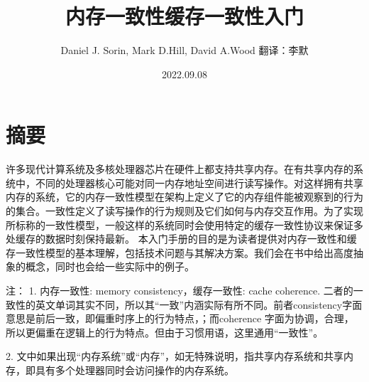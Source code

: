 \documentclass[UTF-8]{ctexbook}
\begin{document}
\title{内存一致性缓存一致性入门}
\author{Daniel J. Sorin, Mark D.Hill, David A.Wood 翻译：李默}
\date{2022.09.08}
\maketitle
\tableofcontents
\chapter*{摘要}
许多现代计算系统及多核处理器芯片在硬件上都支持共享内存。在有共享内存的系统中，不同的处理器核心可能对同一内存地址空间进行读写操作。对这样拥有共享内存的系统，它的内存一致性模型在架构上定义了它的内存组件能被观察到的行为的集合。一致性定义了读写操作的行为规则及它们如何与内存交互作用。为了实现所标称的一致性模型，一般这样的系统同时会使用特定的缓存一致性协议来保证多处缓存的数据时刻保持最新。 本入门手册的目的是为读者提供对内存一致性和缓存一致性模型的基本理解，包括技术问题与其解决方案。我们会在书中给出高度抽象的概念，同时也会给一些实际中的例子。
\par 注： 1. 内存一致性:  memory consistency，缓存一致性:  cache coherence. 二者的一致性的英文单词其实不同，所以其“一致”内涵实际有所不同。前者consistency字面意思是前后一致，即偏重时序上的行为特点，；而coherence 字面为协调，合理，所以更偏重在逻辑上的行为特点。但由于习惯用语，这里通用“一致性”。
\par 2. 文中如果出现“内存系统”或“内存”，如无特殊说明，指共享内存系统和共享内存，即具有多个处理器同时会访问操作的内存系统。
\end{document}
